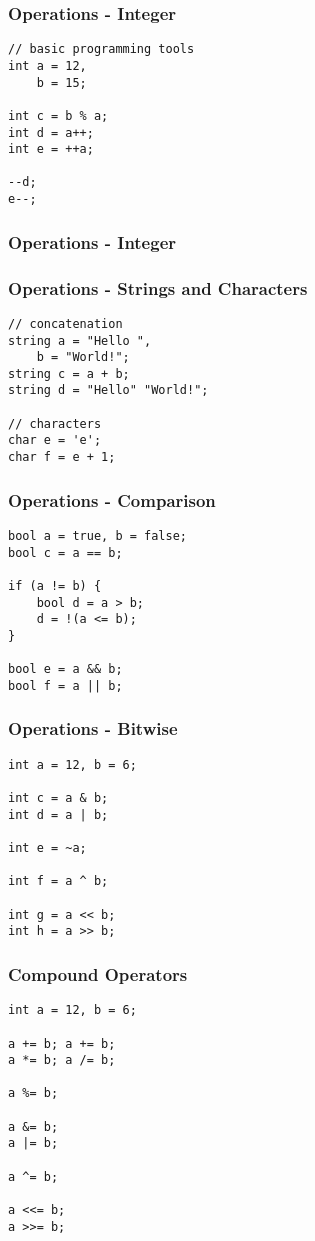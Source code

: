 \begin{frame}[fragile]
    \frametitle{Operations - Integer}
\begin{lstlisting}
// basic programming tools
int a = 12,
    b = 15;

int c = b % a;
int d = a++;
int e = ++a;

--d;
e--;
\end{lstlisting}
\end{frame}

\begin{frame}[fragile]
    \frametitle{Operations - Integer}
    
\end{frame}

\begin{frame}[fragile]
    \frametitle{Operations - Strings and Characters}
\begin{lstlisting}
// concatenation
string a = "Hello ",
    b = "World!";
string c = a + b;
string d = "Hello" "World!";

// characters
char e = 'e';
char f = e + 1;
\end{lstlisting}
\end{frame}

\begin{frame}[fragile]
    \frametitle{Operations - Comparison}
\begin{lstlisting}
bool a = true, b = false;
bool c = a == b;

if (a != b) {
    bool d = a > b;
    d = !(a <= b);
}

bool e = a && b;
bool f = a || b;
\end{lstlisting}
\end{frame}

\begin{frame}[fragile]
    \frametitle{Operations - Bitwise}
\begin{lstlisting}
int a = 12, b = 6;

int c = a & b;
int d = a | b;

int e = ~a;

int f = a ^ b;

int g = a << b;
int h = a >> b;
\end{lstlisting}
\end{frame}

\begin{frame}[fragile]
    \frametitle{Compound Operators}
\begin{lstlisting}
int a = 12, b = 6;

a += b; a += b;
a *= b; a /= b;

a %= b;

a &= b;
a |= b;

a ^= b;

a <<= b;
a >>= b;
\end{lstlisting}
\end{frame}


